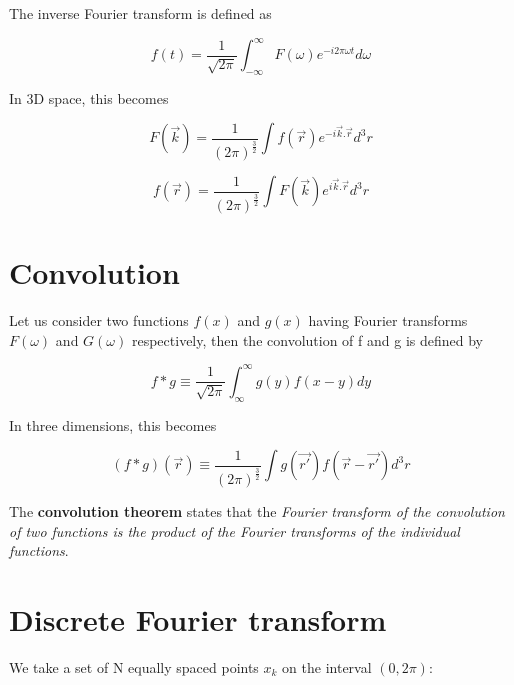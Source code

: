 \documentclass[a4,12pt,oneside]{report}
\begin{document}
        The inverse Fourier transform is defined as
        
        \begin{equation}
         f(t) = \frac{1}{\sqrt{2\pi}}\int_{-\infty}^{\infty} F(\omega)e^{-i2\pi \omega t} d\omega
        \end{equation}
        
        In 3D space, this becomes
        
        \begin{equation}
         F(\vec{k}) = \frac{1}{(2\pi)^\frac{3}{2}}\int f(\vec{r})e^{-i\vec{k}.\vec{r}} d^3r
        \end{equation}
        
        \begin{equation}
         f(\vec{r}) = \frac{1}{(2\pi)^\frac{3}{2}}\int F(\vec{k})e^{i\vec{k}.\vec{r}} d^3r
        \end{equation}
        
        \section{Convolution}
        
        Let us consider two functions $f(x)$ and $g(x)$ having Fourier transforms $F(\omega)$ and $G(\omega)$ respectively, then the convolution of f and g is defined by
        
        \begin{equation}
         f \ast g \equiv \frac{1}{\sqrt{2\pi}} \int_\infty^\infty g(y)f(x-y) dy
        \end{equation}
        
        In three dimensions, this becomes
        
        \begin{equation}
         (f \ast g)(\vec{r}) \equiv \frac{1}{(2\pi)^\frac{3}{2}}\int g(\vec{r'})f(\vec{r}-\vec{r'}) d^3r
        \end{equation}


       The \textbf{convolution theorem} states that the \textit{Fourier transform of the convolution of two functions is the product of the Fourier transforms of the individual functions}.
        
        \section{Discrete Fourier transform}
        
        We take a set of N equally spaced points $x_k$ on the interval $(0,2\pi)$:
        
\end{document}
